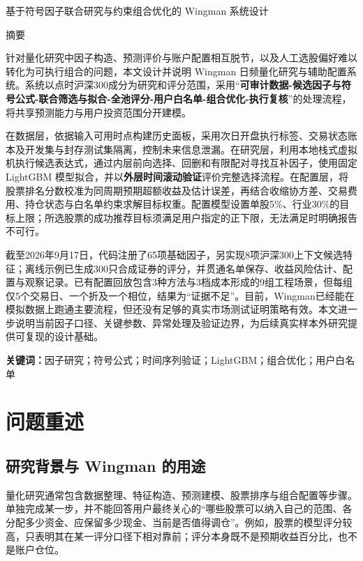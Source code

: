 \documentclass[UTF8,12pt,a4paper,fontset=none]{ctexart}
\newcommand{\keywords}[1]{\par\noindent\textbf{关键词：}#1}
\renewenvironment{abstract}{\begin{center}{\zihao{4} 摘\quad 要}\end{center}}{\par}
\begin{document}
\thispagestyle{plain}
\begin{center}
{ 基于符号因子联合研究与约束组合优化的 Wingman 系统设计\par}
\vspace{1em}
\end{center}
\begin{abstract}

针对量化研究中因子构造、预测评价与账户配置相互脱节，以及人工选股偏好难以转化为可执行组合的问题，本文设计并说明 Wingman 日频量化研究与辅助配置系统。系统以点时沪深300成分为研究和评分范围，采用“\textbf{可审计数据-候选因子与符号公式-联合筛选与拟合-全池评分-用户白名单-组合优化-执行复核}”的处理流程，将共享预测能力与用户投资范围分开建模。


在数据层，依据输入可用时点构建历史面板，采用次日开盘执行标签、交易状态账本及开发集与封存测试集隔离，控制未来信息泄漏。在研究层，利用本地栈式虚拟机执行候选表达式，通过内层前向选择、回删和有限配对寻找互补因子，使用固定 LightGBM 模型拟合，并以\textbf{外层时间滚动验证}评价完整选择流程。在配置层，将股票排名分数校准为同周期预期超额收益及估计误差，再结合收缩协方差、交易费用、持仓状态与白名单约束求解目标权重。配置模型设置单股5\%、行业30\%的目标上限；所选股票的成功推荐目标须满足用户指定的正下限，无法满足时明确报告不可行。


截至2026年9月17日，代码注册了65项基础因子，另实现8项沪深300上下文候选特征；离线示例已生成300只合成证券的评分，并贯通名单保存、收益风险估计、配置与观察记录。已有配置回放包含3种方法与3档成本形成的9组工程场景，但每组仅5个交易日、一个折及一个相位，结果为“证据不足”。目前，Wingman已经能在模拟数据上跑通主要流程，但还没有足够的真实市场测试证明策略有效。本文进一步说明当前因子口径、关键参数、异常处理及验证边界，为后续真实样本外研究提供可复现的设计基础。


\keywords{因子研究；符号公式；时间序列验证；LightGBM；组合优化；用户白名单}\end{abstract}\clearpage

\section{问题重述}

\subsection{研究背景与 Wingman 的用途}

量化研究通常包含数据整理、特征构造、预测建模、股票排序与组合配置等步骤。单独完成某一步，并不能回答用户最终关心的“哪些股票可以纳入自己的范围、各分配多少资金、应保留多少现金、当前是否值得调仓”。例如，股票的模型评分较高，只表明其在某一评分口径下相对靠前；评分本身既不是预期收益百分比，也不是账户仓位。
\end{document}
